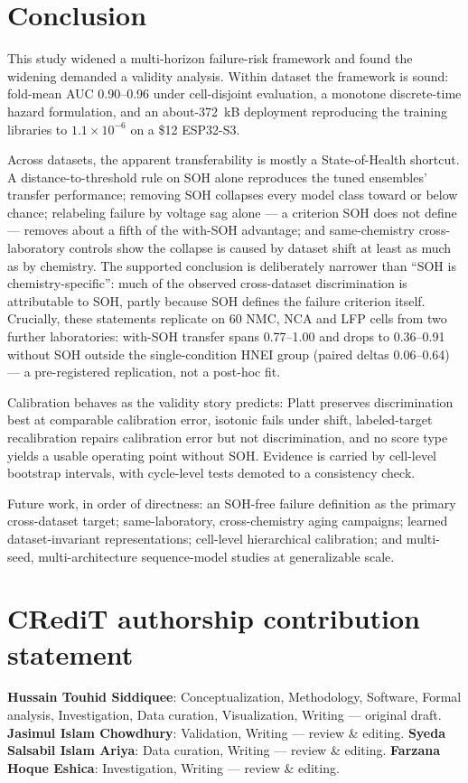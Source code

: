 \documentclass[preprint,12pt]{elsarticle}
\begin{document}
\section{Conclusion}
This study widened a multi-horizon failure-risk framework and found the widening demanded a validity analysis. Within dataset the framework is sound: fold-mean AUC 0.90--0.96 under cell-disjoint evaluation, a monotone discrete-time hazard formulation, and an about-372~kB deployment reproducing the training libraries to $1.1\times10^{-6}$ on a \$12 ESP32-S3.

Across datasets, the apparent transferability is mostly a State-of-Health shortcut. A distance-to-threshold rule on SOH alone reproduces the tuned ensembles' transfer performance; removing SOH collapses every model class toward or below chance; relabeling failure by voltage sag alone --- a criterion SOH does not define --- removes about a fifth of the with-SOH advantage; and same-chemistry cross-laboratory controls show the collapse is caused by dataset shift at least as much as by chemistry. The supported conclusion is deliberately narrower than ``SOH is chemistry-specific'': much of the observed cross-dataset discrimination is attributable to SOH, partly because SOH defines the failure criterion itself. Crucially, these statements replicate on 60 NMC, NCA and LFP cells from two further laboratories: with-SOH transfer spans 0.77--1.00 and drops to 0.36--0.91 without SOH outside the single-condition HNEI group (paired deltas 0.06--0.64) --- a pre-registered replication, not a post-hoc fit.

Calibration behaves as the validity story predicts: Platt preserves discrimination best at comparable calibration error, isotonic fails under shift, labeled-target recalibration repairs calibration error but not discrimination, and no score type yields a usable operating point without SOH. Evidence is carried by cell-level bootstrap intervals, with cycle-level tests demoted to a consistency check.

Future work, in order of directness: an SOH-free failure definition as the primary cross-dataset target; same-laboratory, cross-chemistry aging campaigns; learned dataset-invariant representations; cell-level hierarchical calibration; and multi-seed, multi-architecture sequence-model studies at generalizable scale.

\clearpage
\section*{CRediT authorship contribution statement}
\textbf{Hussain Touhid Siddiquee}: Conceptualization, Methodology, Software, Formal analysis, Investigation, Data curation, Visualization, Writing --- original draft. \textbf{Jasimul Islam Chowdhury}: Validation, Writing --- review \& editing. \textbf{Syeda Salsabil Islam Ariya}: Data curation, Writing --- review \& editing. \textbf{Farzana Hoque Eshica}: Investigation, Writing --- review \& editing.
\end{document}
